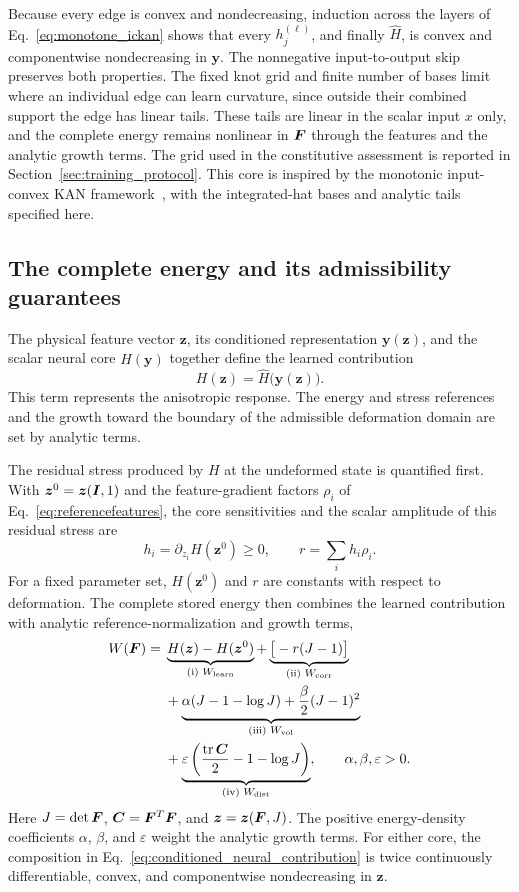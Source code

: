 Because every edge is convex and nondecreasing, induction across the layers of Eq.~\eqref{eq:monotone_ickan} shows that every $h_j^{(\ell)}$, and finally $\widehat H$, is convex and componentwise nondecreasing in $\bm y$. The nonnegative input-to-output skip preserves both properties. The fixed knot grid and finite number of bases limit where an individual edge can learn curvature, since outside their combined support the edge has linear tails. These tails are linear in the scalar input $x$ only, and the complete energy remains nonlinear in $\bm F$ through the features and the analytic growth terms. The grid used in the constitutive assessment is reported in Section~\ref{sec:training_protocol}. This core is inspired by the monotonic input-convex KAN framework~\cite{thakolkaran2025}, with the integrated-hat bases and analytic tails specified here.

\subsection{The complete energy and its admissibility guarantees}
\label{sec:energy_admissibility}
The physical feature vector $\bm z$, its conditioned representation $\bm y(\bm z)$, and the scalar neural core $\widehat H(\bm y)$ together define the learned contribution
\begin{equation}
 H(\bm z)=\widehat H\bigl(\bm y(\bm z)\bigr).
 \label{eq:conditioned_neural_contribution}
\end{equation}
This term represents the anisotropic response. The energy and stress references and the growth toward the boundary of the admissible deformation domain are set by analytic terms.

The residual stress produced by $H$ at the undeformed state is quantified first. With $\bm z^0=\bm z(\bm I,1)$ and the feature-gradient factors $\rho_i$ of Eq.~\eqref{eq:referencefeatures}, the core sensitivities and the scalar amplitude of this residual stress are
\begin{equation}
 h_i=\partial_{z_i}H(\bm z^0)\geq0,
 \qquad
 r=\sum_i h_i\rho_i.
\end{equation}
For a fixed parameter set, $H(\bm z^0)$ and $r$ are constants with respect to deformation. The complete stored energy then combines the learned contribution with analytic reference-normalization and growth terms,
\begin{align}
 W(\bm F)={}&\underbrace{H(\bm z)-H(\bm z^0)}_{\text{(i) }W_{\rm learn}}
 +\underbrace{\big[-r(J-1)\big]}_{\text{(ii) }W_{\rm corr}}\nonumber\\
 &+\underbrace{\alpha(J-1-\log J)+\frac\beta2(J-1)^2}_{\text{(iii) }W_{\rm vol}}\nonumber\\
 &+\underbrace{\varepsilon\left(\frac{\operatorname{tr}\bm C}{2}-1-\log J\right)}_{\text{(iv) }W_{\rm dist}},
 \qquad \alpha,\beta,\varepsilon>0.
 \label{eq:energy}
\end{align}
Here $J=\det\bm F$, $\bm C=\bm F^T\bm F$, and $\bm z=\bm z(\bm F,J)$. The positive energy-density coefficients $\alpha$, $\beta$, and $\varepsilon$ weight the analytic growth terms. For either core, the composition in Eq.~\eqref{eq:conditioned_neural_contribution} is twice continuously differentiable, convex, and componentwise nondecreasing in $\bm z$.

